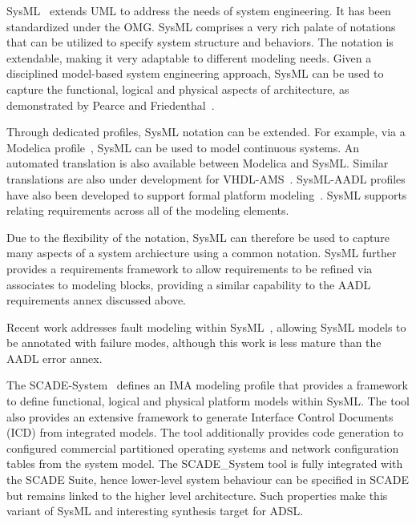 SysML~\cite{SysML} extends UML to address the needs of system engineering. It has been standardized under the OMG. SysML comprises a very rich palate of notations that can be utilized to specify system structure and behaviors.  The notation is extendable, making it very adaptable to different modeling needs. Given a disciplined model-based system engineering approach, SysML can be used to capture the functional, logical and physical aspects of architecture, as demonstrated by Pearce and Friedenthal~\cite{pearce2013practical}.

Through dedicated profiles, SysML notation can be extended.  For example, via a Modelica profile~\cite{paredis20105}, SysML can be used to model continuous systems. An automated translation is also available between Modelica and SysML.  Similar translations are also under development for VHDL-AMS~\cite{verries2013case}. SysML-AADL profiles have also been developed to support formal platform modeling~\cite{behjati2011extending,cofer2012compositional}. SysML supports relating requirements across all of the modeling elements.

Due to the flexibility of the notation, SysML can therefore be used to capture many aspects of a system archiecture using a common notation. SysML further provides a requirements framework to allow requirements to be refined via associates to modeling  blocks, providing a similar capability to the AADL requirements annex discussed above.

Recent work addresses fault modeling within SysML~\cite{pearce2013practical}, allowing SysML models to be annotated with failure modes, although this work is less mature than the AADL error annex.

The SCADE-System~\cite{scade} defines an IMA modeling profile that provides a framework to define functional, logical and physical platform models within SysML. The tool also provides an extensive framework to generate Interface Control Documents (ICD) from integrated models. The tool additionally provides code generation to configured commercial partitioned operating systems and network configuration tables from the system model.  The SCADE\_System tool is fully integrated with the SCADE
Suite, hence lower-level system behaviour can be specified in SCADE but remains linked to the higher level architecture.  Such properties make this variant of SysML and interesting synthesis target for ADSL.

